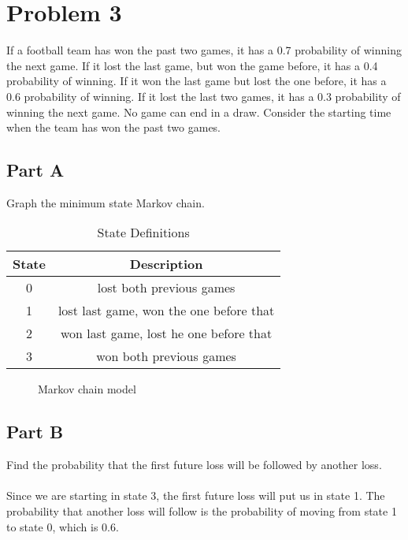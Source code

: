 \documentclass{amsart}
\begin{document}
	\section{Problem 3}
	If a football team has won the past two games, it has a 0.7 probability of winning the next game. If it lost the last game, but won the game before, it has a 0.4 probability of winning. If it won the last game but lost the one before, it has a 0.6 probability of winning. If it lost the last two games, it has a 0.3 probability of winning the next game. No game can end in a draw. Consider the starting time when the team has won the past two games.
	\subsection{Part A}
	Graph the minimum state Markov chain.
	\begin{table}[h!]
		\centering
		\caption{State Definitions}
		\begin{tabular}{c|c}
			State & Description\\
			\hline
			0 & lost both previous games\\
			1 & lost last game, won the one before that\\
			2 & won last game, lost he one before that\\
			3 & won both previous games
		\end{tabular}
	\end{table}
	\begin{figure}[h!]
		\centering
	\caption{Markov chain model}
	\end{figure}
	
	\subsection{Part B}
	Find the probability that the first future loss will be followed by another loss.\\
	\\
	Since we are starting in state 3, the first future loss will put us in state 1. The probability that another loss will follow is the probability of moving from state 1 to state 0, which is 0.6.
	\\
\end{document}
